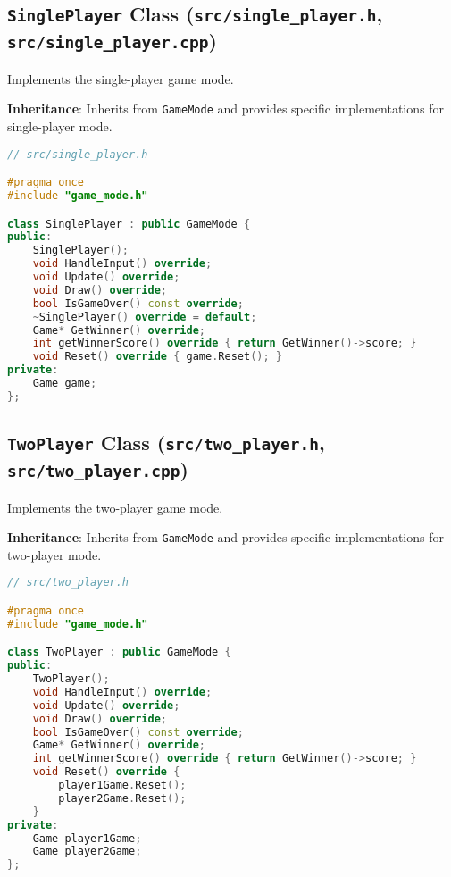 \documentclass{article}
\begin{document}
\subsection{\texttt{SinglePlayer} Class (\texttt{src/single\_player.h}, \texttt{src/single\_player.cpp})}

Implements the single-player game mode.

\textbf{Inheritance}: Inherits from \texttt{GameMode} and provides specific implementations for single-player mode.

\begin{lstlisting}[language=C++]
// src/single_player.h

#pragma once
#include "game_mode.h"

class SinglePlayer : public GameMode {
public:
    SinglePlayer();
    void HandleInput() override;
    void Update() override;
    void Draw() override;
    bool IsGameOver() const override;
    ~SinglePlayer() override = default;
    Game* GetWinner() override;
    int getWinnerScore() override { return GetWinner()->score; }
    void Reset() override { game.Reset(); }
private:
    Game game;
};
\end{lstlisting}
\subsection{\texttt{TwoPlayer} Class (\texttt{src/two\_player.h}, \texttt{src/two\_player.cpp})}

Implements the two-player game mode.

\textbf{Inheritance}: Inherits from \texttt{GameMode} and provides specific implementations for two-player mode.

\begin{lstlisting}[language=C++]
// src/two_player.h

#pragma once
#include "game_mode.h"

class TwoPlayer : public GameMode {
public:
    TwoPlayer();
    void HandleInput() override;
    void Update() override;
    void Draw() override;
    bool IsGameOver() const override;
    Game* GetWinner() override;
    int getWinnerScore() override { return GetWinner()->score; }
    void Reset() override { 
        player1Game.Reset(); 
        player2Game.Reset(); 
    }
private:
    Game player1Game;
    Game player2Game;
};
\end{lstlisting}
\end{document}
